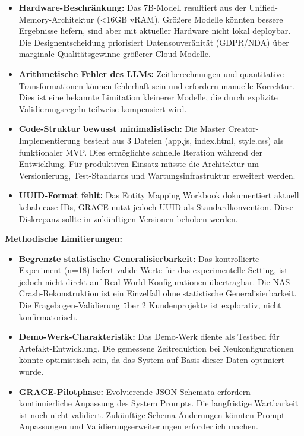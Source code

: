 \begin{itemize}
    \item \textbf{Hardware-Beschränkung:} Das 7B-Modell resultiert aus der Unified-Memory-Architektur (<16GB vRAM). Größere Modelle könnten bessere Ergebnisse liefern, sind aber mit aktueller Hardware nicht lokal deploybar. Die Designentscheidung priorisiert Datensouveränität (GDPR/NDA) über marginale Qualitätsgewinne größerer Cloud-Modelle.

    \item \textbf{Arithmetische Fehler des LLMs:} Zeitberechnungen und quantitative Transformationen können fehlerhaft sein und erfordern manuelle Korrektur. Dies ist eine bekannte Limitation kleinerer Modelle, die durch explizite Validierungsregeln teilweise kompensiert wird.

    \item \textbf{Code-Struktur bewusst minimalistisch:} Die Master Creator-Implementierung besteht aus 3 Dateien (app.js, index.html, style.css) als funktionaler MVP. Dies ermöglichte schnelle Iteration während der Entwicklung. Für produktiven Einsatz müsste die Architektur um Versionierung, Test-Standards und Wartungsinfrastruktur erweitert werden.

    \item \textbf{UUID-Format fehlt:} Das Entity Mapping Workbook dokumentiert aktuell kebab-case IDs, GRACE nutzt jedoch UUID als Standardkonvention. Diese Diskrepanz sollte in zukünftigen Versionen behoben werden.
\end{itemize}

\textbf{Methodische Limitierungen:}

\begin{itemize}
    \item \textbf{Begrenzte statistische Generalisierbarkeit:} Das kontrollierte Experiment (n=18) liefert valide Werte für das experimentelle Setting, ist jedoch nicht direkt auf Real-World-Konfigurationen übertragbar. Die NAS-Crash-Rekonstruktion ist ein Einzelfall ohne statistische Generalisierbarkeit. Die Fragebogen-Validierung über 2 Kundenprojekte ist explorativ, nicht konfirmatorisch.

    \item \textbf{Demo-Werk-Charakteristik:} Das Demo-Werk diente als Testbed für Artefakt-Entwicklung. Die gemessene Zeitreduktion bei Neukonfigurationen könnte optimistisch sein, da das System auf Basis dieser Daten optimiert wurde.

    \item \textbf{GRACE-Pilotphase:} Evolvierende JSON-Schemata erfordern kontinuierliche Anpassung des System Prompts. Die langfristige Wartbarkeit ist noch nicht validiert. Zukünftige Schema-Änderungen könnten Prompt-Anpassungen und Validierungserweiterungen erforderlich machen.
\end{itemize}

